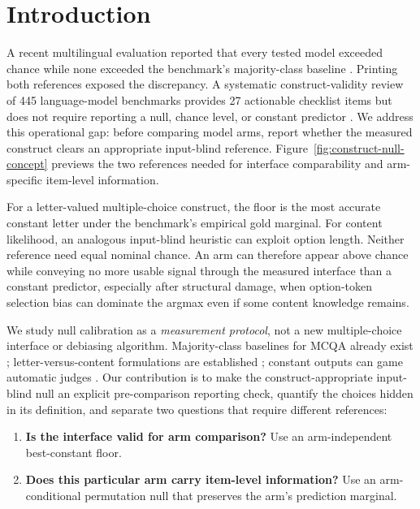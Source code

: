 \section{Introduction}

A recent multilingual evaluation reported that every tested model exceeded chance while none exceeded the benchmark's majority-class baseline \citep{arcon2026metalinguistic}. Printing both references exposed the discrepancy. A systematic construct-validity review of 445 language-model benchmarks provides 27 actionable checklist items but does not require reporting a null, chance level, or constant predictor \citep{bean2025measuring}. We address this operational gap: before comparing model arms, report whether the measured construct clears an appropriate input-blind reference. Figure~\ref{fig:construct-null-concept} previews the two references needed for interface comparability and arm-specific item-level information.

For a letter-valued multiple-choice construct, the floor is the most accurate constant letter under the benchmark's empirical gold marginal. For content likelihood, an analogous input-blind heuristic can exploit option length. Neither reference need equal nominal chance. An arm can therefore appear above chance while conveying no more usable signal through the measured interface than a constant predictor, especially after structural damage, when option-token selection bias \citep{zheng2024selectors} can dominate the argmax even if some content knowledge remains.

We study null calibration as a \emph{measurement protocol}, not a new multiple-choice interface or debiasing algorithm. Majority-class baselines for MCQA already exist \citep{balepur2024artifacts}; letter-versus-content formulations are established \citep{gu2025olmes,cho2026choices}; constant outputs can game automatic judges \citep{zheng2025cheating}. Our contribution is to make the construct-appropriate input-blind null an explicit pre-comparison reporting check, quantify the choices hidden in its definition, and separate two questions that require different references:

\begin{enumerate}[leftmargin=*,nosep]
    \item \textbf{Is the interface valid for arm comparison?} Use an arm-independent best-constant floor.
    \item \textbf{Does this particular arm carry item-level information?} Use an arm-conditional permutation null that preserves the arm's prediction marginal.
\end{enumerate}

